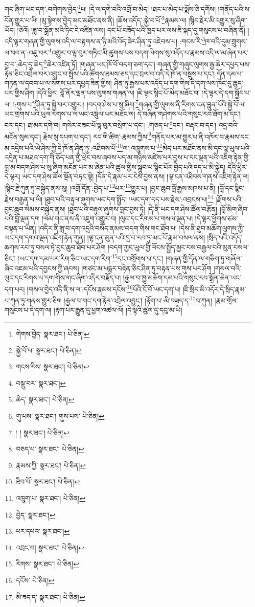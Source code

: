 གང་ཞིག་ཡང་དག་:བགེགས་བྱེད་\footnote{གེགས་བྱེད་  སྣར་ཐང་།  པེ་ཅིན། }པ། །དེ་ལ་དགེ་བའི་འགྲོ་བ་མེད། །ཐར་པ་མེད་པ་སྨོས་ཅི་དགོས། །གནོད་པའི་ས་བོན་གྱུར་པ་ཡི། །མུ་སྟེགས་བྱེད་མང་མཐོང་ནས་ནི། །ཆོས་འདོད་:སྐྱེ་བ་པོ་\footnote{སྐྱེ་བོ་པ་  སྣར་ཐང་།  པེ་ཅིན། }རྣམས་ལ། །སྙིང་རྗེར་མི་འགྱུར་སུ་ཞིག་ཡོད། །ཅེའོ། །ཟླ་བ་སྒྲོན་མའི་ཏིང་ངེ་འཛིན་ལས། དང་པོ་བཟོད་པའི་ཁྱད་པར་ལས་ཇི་སྐད་དུ་གསུངས་པ་བཞིན་ནོ། །འདི་ལྟར་གཞན་གྱི་ལུགས་འདི་ལ་བརྟགས་ན་ཉི་མའི་འོད་ཟེར་ཤིན་ཏུ་འཇེབས་པ། :གངས་རི་\footnote{གངས་རིས་  སྣར་ཐང་།  པེ་ཅིན། }ཁ་བའི་དུམ་གྲུགས་ལ་བབ་ན་:འཇུ་བར་\footnote{བསྡུ་བར་  སྣར་ཐང་། }འགྱུར་བ་ལྟ་བུར་གཏིང་མི་ཚུགས་པས་བདག་ལེགས་སུ་འདོད་པ་རྣམས་འདི་ལ་མ་ཞེན་པར་བྱ་བ་:ཆེད་དུ་ཆེད་\footnote{ཆེད་  སྣར་ཐང་།  པེ་ཅིན། }ཆེར་འཛིན་ཏོ། །གཞན་ཡང་ཁོ་བོ་བདག་ཅག་དང་། གཞན་གྱི་གཞུང་ལུགས་རྒྱ་ཆེར་དཔྱད་པས་རྟེན་ཅིང་འབྲེལ་བར་འབྱུང་བ་སྤྲོས་པའི་ཚོགས་ཐམས་ཅད་དང་བྲལ་བ་འདི་དེ་ཁོ་ན་བསྡུས་པ་དང་། དོན་དམ་པ་གཏན་ལ་དབབ་པ་ལ་སོགས་པར་དཔྱད་ཟིན་གྱིས། ཤིན་ཏུ་རྒྱས་པར་འདོད་པ་དག་གིས་དེ་དག་ལས་ཁོང་དུ་ཆུད་པར་གྱིས་ཤིག །དེའི་ཕྱིར། བློ་ནོར་ལྡན་པས་ལུགས་གཞན་ལ། །ཇི་ལྟར་སྙིང་པོ་མེད་མཐོང་བ། །དེ་ལྟར་དེ་དག་སྐྱོབ་པ་ལ། །:གུས་པ་\footnote{གུ་པས་  སྣར་ཐང་། གུས་པས་  པེ་ཅིན། }ཤིན་ཏུ་སྐྱེ་བར་འགྱུར:། །བདག་ཤེས་པ་སུ་ཞིག་\footnote{། །  སྣར་ཐང་།  པེ་ཅིན། }གཞན་གྱི་ལུགས་ནི་རིགས་ངན་བླུན་པོའི་སྐྱེ་བོ་ལ་ཡང་གྲགས་པའི་ཡུལ་རགས་པ་ལ་ཡང་འཁྲུལ་པར་མཐོང་ལ། དེ་བཞིན་གཤེགས་པའི་གསུང་རབ་ཐོག་མ་དང་། བར་དང་། ཐ་མར་དགེ་བ། གསེར་བཟང་པོ་ལྟ་བུར་བསྲེག་པ་དང་། :གཅད་པ་\footnote{བཅད་པ་  སྣར་ཐང་།  པེ་ཅིན། }དང་། བརྡར་བ་དང་། འདྲ་བའི་མངོན་སུམ་དང་། རྗེས་སུ་དཔག་པ་དང་། རང་གི་ཚིག་:རྣམས་ཀྱིས་\footnote{རྣམས་ཀྱི་  སྣར་ཐང་།  པེ་ཅིན། }གནོད་པར་མ་གྱུར་པ་ནི་འཁོར་བ་རྣམས་དང་མ་འདྲེས་པའི་ཡེ་ཤེས་ཀྱི་དེ་ཁོ་ན་ཤིན་ཏུ་:འཐིབས་པོ་\footnote{ཐིབ་པོ་  སྣར་ཐང་།  པེ་ཅིན། }ལ་:འཁྲུགས་པ་\footnote{འཁྲུག་པ་  སྣར་ཐང་།  པེ་ཅིན། }མེད་པར་མཐོང་ནས་མི་དང་ལྷ་ཡུལ་པའི་འདྲེན་པ་མཐའ་དག་གི་ཅོད་པན་གྱི་ཕྲེང་བས་ཞབས་པད་མ་གཉིས་མཛེས་པར་བྱས་པ་དང་ལྡན་པའི་འཇིག་རྟེན་གྱི་བླ་མ་བདག་ཤེས་པ་སུ་ཞིག་མངོན་པར་མ་ཞེན་པའི་ཚུལ་གྱིས་སྒྲུབ་པ་སྙིང་པོར་བྱེད་པའི་དད་པ་མི་སྐྱེད། དེའི་ཕྱིར་དེ་ལྟར། ཡང་དག་ཤེས་ཚོལ་སྔོན་བཏང་སྟེ། །དོན་དེ་རྣམ་པར་ངེས་བྱས་ནས། །ལྟ་ངན་འཐིབས་གནས་འཇིག་རྟེན་ལ། །སྙིང་རྗེ་ཀུན་ཏུ་བསྐྱེད་ནས་སུ། །འགྲོ་དོན་:བྱེད་པ་\footnote{བྱེད་  སྣར་ཐང་། }པར་\footnote{པར་དཔའ་  སྣར་ཐང་། }གྱུར་པ། །བྱང་ཆུབ་བློ་རྒྱས་མཁས་པ་ནི། །བློ་དང་སྙིང་རྗེས་བརྒྱན་པ་ཡི། །ཐུབ་པའི་བརྟུལ་ཞུགས་ཡང་དག་སྤྱོད། །ཡང་དག་དད་པས་རྗེས་:འབྲངས་པ།\footnote{འབྲང་བ།  སྣར་ཐང་།  པེ་ཅིན། } །རྫོགས་པའི་བྱང་ཆུབ་སེམས་བསྐྱེད་ནས། །ཐུབ་པའི་བརྟུལ་ཞུགས་བླང་བྱས་ཏེ། །དེ་ནི་ཡང་དག་ཤེས་ཚོལ་བརྩོན། །བློ་མིག་ཞིབ་པའི་བློ་ལྡན་དག །ལམ་གང་ནས་ནི་འཇུག་འགྱུར་བ། །ལུང་དང་རིགས་པ་གསལ་ལྡན་པ། །དེ་ལྟར་ཕྱོགས་ཙམ་བསྟན་པ་ཡིན། །འདིར་ནི་ཟླ་བ་དག་འདྲའི་བསོད་ནམས་བདག་གིས་གང་ཐོབ་པ། །དེས་ནི་ཐུབ་མཆོག་ལུགས་ཀྱི་ཡང་དག་དགའ་ལྡན་འཇིག་རྟེན་ཀུན། །ལྟ་ངན་མུན་པའི་དྲ་བ་རབ་ཏུ་མང་པོ་རྣམ་བསལ་ནས། །སྲིད་པའི་འདོད་ཆགས་རབ་ཏུ་བསལ་ཏེ་བྱང་ཆུབ་ཐོབ་པར་ཤོག །བདག་ཀྱང་ཡུལ་གྱི་ལོངས་སྤྱོད་མྱང་བས་བརྒྱལ་བའི་མུན་བསལ་ཅིང་། །ཡང་དག་དམ་པར་རིག་ཅིང་ཡང་དག་རིག་\footnote{རིགས་  སྣར་ཐང་།  པེ་ཅིན། }དང་འགྲོགས་པ་དང་། །གཞན་གྱི་དོན་ལ་གཅིག་ཏུ་གཞོལ་ཞིང་འཇམ་པའི་དབྱངས་ཀྱི་ཞབས། །གཙང་མ་པདྨར་བརྟེན་ཅིང་ཤིན་ཏུ་བརྟན་པས་གུས་པར་ཤོག །གསལ་བའི་ལུང་དང་རིགས་པ་དག་གིས་གང་ཞིག་འདིར་བརྗོད་པ། །རྒྱལ་བ་ཁྱུ་མཆོག་དམ་པའི་གསུང་རབ་སྒྲོན་ཆེན་ཡང་དག་པར། །གསལ་བྱེད་འདི་ནི་ས་ལ་:དངོས་རྣམས་དངོས་\footnote{དངོས་  པེ་ཅིན། }པོའི་ངོ་བོ་ཡང་དག་པ། །ཇི་སྲིད་མི་འདོར་དེ་སྲིད་རྣམ་པ་ཀུན་ཏུ་གནས་གྱུར་ཅིག །རྒྱལ་བ་གང་དག་རྟེན་འབྲེལ་འབྱུང་། །རྟོག་པ་:མི་བཟད་ད་\footnote{མི་ཟད་ད་  སྣར་ཐང་།  པེ་ཅིན། }བ་ཀུན། །རྣམ་གྲོལ་གསུངས་པ་དེ་དག་ལ། །རྟག་པར་རྒྱུན་དུ་ཕྱག་འཚལ་ལོ། །དེ་ལྟའི་ཚུལ་དུ་དབུ་མ་ཡི། 
